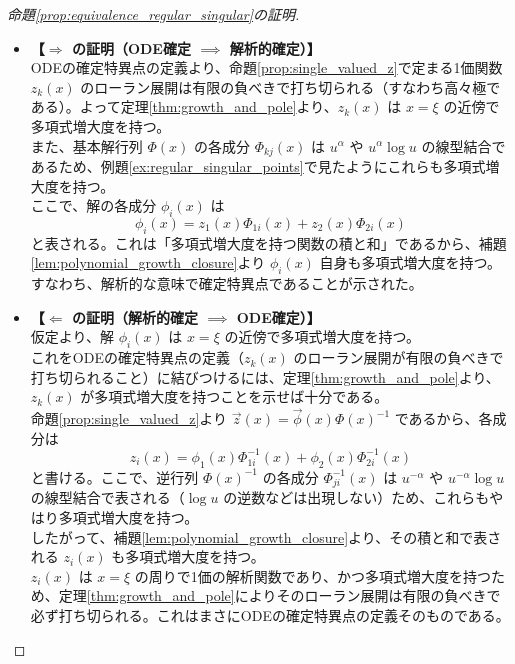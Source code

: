 \documentclass[paper=a4, fontsize=11pt]{jlreq} %
\theoremstyle{break}
\theoremstyle{qa}
\theoremstyle{remark} %
\begin{document}
\begin{proof}[命題\ref{prop:equivalence_regular_singular}の証明]
\begin{itemize}
    \item \textbf{【$\Rightarrow$ の証明（ODE確定 $\implies$ 解析的確定）】}\\
    ODEの確定特異点の定義より、命題\ref{prop:single_valued_z}で定まる1価関数 $z_{k}(x)$ のローラン展開は有限の負べきで打ち切られる（すなわち高々極である）。よって定理\ref{thm:growth_and_pole}より、$z_k(x)$ は $x=\xi$ の近傍で多項式増大度を持つ。\\
    また、基本解行列 $\Phi(x)$ の各成分 $\Phi_{kj}(x)$ は $u^{\alpha}$ や $u^{\alpha}\log u$ の線型結合であるため、例題\ref{ex:regular_singular_points}で見たようにこれらも多項式増大度を持つ。\\
    ここで、解の各成分 $\phi_i(x)$ は
    \[
    \phi_{i}(x) = z_{1}(x)\Phi_{1i}(x) + z_{2}(x)\Phi_{2i}(x)
    \]
    と表される。これは「多項式増大度を持つ関数の積と和」であるから、補題\ref{lem:polynomial_growth_closure}より $\phi_i(x)$ 自身も多項式増大度を持つ。すなわち、解析的な意味で確定特異点であることが示された。

    \item \textbf{【$\Leftarrow$ の証明（解析的確定 $\implies$ ODE確定）】}\\
    仮定より、解 $\phi_i(x)$ は $x=\xi$ の近傍で多項式増大度を持つ。\\
    これをODEの確定特異点の定義（$z_k(x)$ のローラン展開が有限の負べきで打ち切られること）に結びつけるには、定理\ref{thm:growth_and_pole}より、$z_k(x)$ が多項式増大度を持つことを示せば十分である。\\
    命題\ref{prop:single_valued_z}より $\vec{z}(x) = \vec{\phi}(x)\Phi(x)^{-1}$ であるから、各成分は
    \[
    z_{i}(x) = \phi_{1}(x)\Phi_{1i}^{-1}(x) + \phi_{2}(x)\Phi_{2i}^{-1}(x)
    \]
    と書ける。ここで、逆行列 $\Phi(x)^{-1}$ の各成分 $\Phi_{ji}^{-1}(x)$ は $u^{-\alpha}$ や $u^{-\alpha}\log u$ の線型結合で表される（$\log u$ の逆数などは出現しない）ため、これらもやはり多項式増大度を持つ。\\
    したがって、補題\ref{lem:polynomial_growth_closure}より、その積と和で表される $z_i(x)$ も多項式増大度を持つ。\\
    $z_i(x)$ は $x=\xi$ の周りで1価の解析関数であり、かつ多項式増大度を持つため、定理\ref{thm:growth_and_pole}によりそのローラン展開は有限の負べきで必ず打ち切られる。これはまさにODEの確定特異点の定義そのものである。
\end{itemize}
\end{proof}
\end{document}
